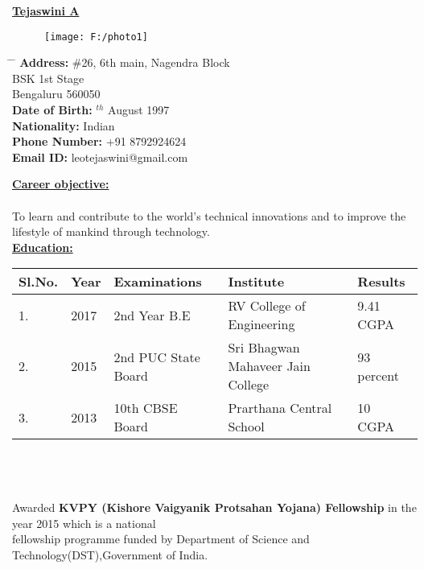 \documentclass[10pt]{article}
\begin{document}
\hspace{5cm}
\underline{\textbf{\huge{Tejaswini A}}}

\begin{figure}[h]
	\hspace{5cm}
	\texttt{[image: F:/photo1]}
\end{figure}

\parbox{1.5\textwidth}{
	\begin{tabbing} 
		\hspace{3cm} \= \hspace{10cm} \= \kill
		{\bf Address:} \> \#26, 6th main, Nagendra Block\\ 
		\> BSK 1st Stage\\ 
		\> Bengaluru 560050\\
		{\bf Date of Birth:} $^{th}$ August 1997  \\ 
		{\bf Nationality:} \> Indian\\
		{\bf Phone Number:} \> +91 8792924624\\
		{\bf Email ID:} \>leotejaswini@gmail.com\\
\end{tabbing}}
\hfill

\underline{\textbf{\Large{Career objective:}}}\\\\To learn and contribute to the world's technical innovations and to improve the lifestyle of mankind through technology.
\hfill\\
	
\underline{\textbf{\Large{Education:}}}
\vspace{0.5cm}


\begin{tabular}{|p{1.5cm}|p{1.5cm}|p{5cm}|p{4.5cm}|p{2.5cm}|}
	\hline
	\textbf{Sl.No.} & \textbf{Year} & \textbf{Examinations} & \textbf{Institute} & \textbf{Results}\\ [0.5ex] 
	\hline
	1. & 2017 &2nd Year B.E &RV College of Engineering& 9.41 CGPA \\ 
	\hline
	2. & 2015 &2nd PUC State Board & Sri Bhagwan Mahaveer Jain College& 93 percent \\
	\hline
	3. & 2013 & 10th CBSE Board & Prarthana Central School &10 CGPA \\
	\hline
	
\end{tabular}
\\\\\\
Awarded \textbf{KVPY (Kishore Vaigyanik Protsahan Yojana) Fellowship} in the year 2015 which is a national\\ fellowship  programme funded by Department of Science and Technology(DST),Government of India.
\hfill 
\end{document}
